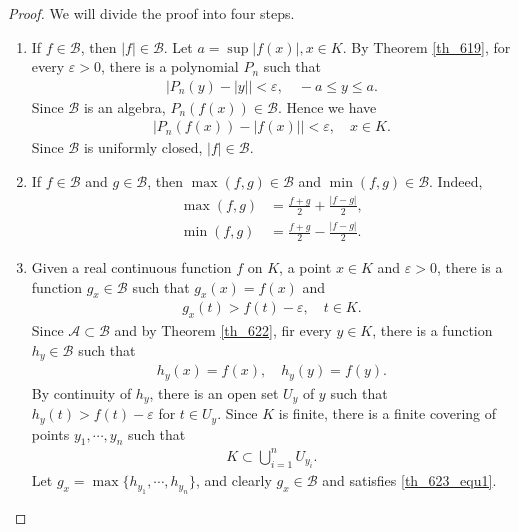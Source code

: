 \documentclass[11pt]{book}
\theoremstyle{definition}
\numberwithin{equation}{chapter}
\begin{document}
\begin{proof}
We will divide the proof into four steps.
\begin{enumerate}[label=(\Roman*)]
    \item If $f \in \mathscr{B}$, then $\left|f\right| \in \mathscr{B}$. Let $a = \sup \left|f(x)\right|, x \in K$. By Theorem \ref{th_619}, for every $\varepsilon > 0$, there is a polynomial $P_n$ such that
    \begin{align*}
        \left|P_n(y) - \left|y\right|\right| < \varepsilon, \quad -a \leq y \leq a.
    \end{align*}
    Since $\mathscr{B}$ is an algebra, $P_n(f(x)) \in \mathscr{B}$. Hence we have 
    \begin{align*}
        \left|P_n(f(x)) - \left|f(x)\right|\right| < \varepsilon, \quad x \in K.
    \end{align*}
    Since $\mathscr{B}$ is uniformly closed, $\left|f\right| \in \mathscr{B}$.
    
    \item If $f \in \mathscr{B}$ and $g \in \mathscr{B}$, then $\max (f,g) \in \mathscr{B}$ and $\min (f,g) \in \mathscr{B}$. Indeed, 
    \begin{align*}
        \max(f,g) & = \frac{f + g}{2} + \frac{\left|f - g\right|}{2}, \\
        \min(f,g) & = \frac{f + g}{2} - \frac{\left|f - g\right|}{2}.
    \end{align*}
    
    \item Given a real continuous function $f$ on $K$, a point $x \in K$ and $\varepsilon > 0$, there is a function $g_x \in \mathscr{B}$ such that $g_x(x) = f(x)$ and
    \begin{align}\label{th_623_equ1}
        g_x(t) > f(t) - \varepsilon, \quad t \in K.
    \end{align}
    Since $\mathscr{A} \subset \mathscr{B}$ and by Theorem \ref{th_622}, fir every $y \in K$, there is a function $h_y \in \mathscr{B}$ such that
    \begin{align*}
        h_y(x) = f(x), \quad h_y(y) = f(y).
    \end{align*}
    By continuity of $h_y$, there is an open set $U_y$ of $y$ such that $h_y(t) > f(t) - \varepsilon$ for $t \in U_y$. Since $K$ is finite, there is a finite covering of points $y_1, \cdots, y_n$ such that 
    \begin{align*}
        K \subset \bigcup^n_{i=1} U_{y_i}.
    \end{align*}
    Let $g_x = \max \{h_{y_1}, \cdots, h_{y_n}\}$, and clearly $g_x \in \mathscr{B}$ and satisfies \eqref{th_623_equ1}. 
    \label{th_623_3}
    

\end{enumerate}
\end{proof}
\end{document}
